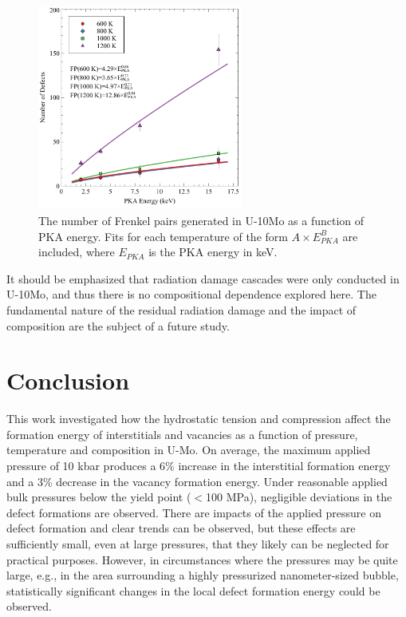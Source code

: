 \documentclass[review]{elsarticle}
\begin{document}
\begin{figure}[h!]
    \centering
    \includegraphics[width=0.6\textwidth]{FPvsE.pdf}
    \caption{The number of Frenkel pairs generated in U-10Mo as a function of PKA energy. Fits for each temperature of the form $A{\times}E_{PKA}^B$ are included, where $E_{PKA}$ is the PKA energy in keV.}
    \label{fig:def_power}
\end{figure}

It should be emphasized that radiation damage cascades were only conducted in U-10Mo, and thus there is no compositional dependence explored here. The fundamental nature of the residual radiation damage and the impact of composition are the subject of a future study. 

\FloatBarrier

\section{Conclusion}\label{sec4}
This work investigated how the hydrostatic tension and compression affect the formation energy of interstitials and vacancies as a function of pressure, temperature and composition in U-Mo. On average, the maximum applied pressure of 10 kbar produces a 6\% increase in the interstitial formation energy and a 3\% decrease in the vacancy formation energy. Under reasonable applied bulk pressures below the yield point ($<$100 MPa), negligible deviations in the defect formations are observed. There are impacts of the applied pressure on defect formation and clear trends can be observed, but these effects are sufficiently small, even at large pressures, that they likely can be neglected for practical purposes. However, in circumstances where the pressures may be quite large, e.g., in the area surrounding a highly pressurized nanometer-sized bubble, statistically significant changes in the local defect formation energy could be observed.
\end{document}
